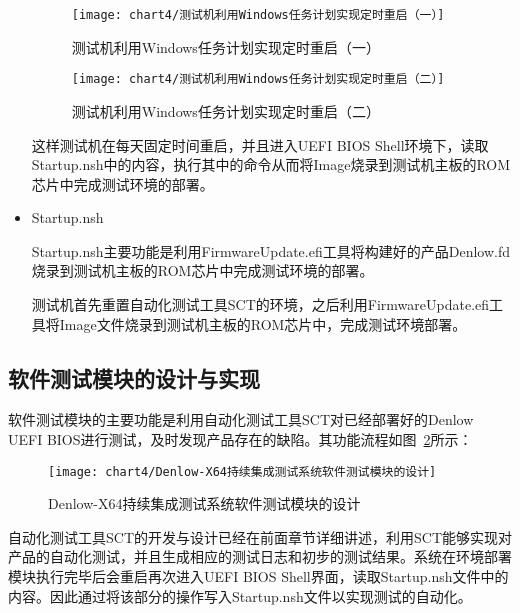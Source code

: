 \begin{itemize}
				\begin{figure}[H]
					\begin{minipage}{0.48\textwidth}
					  \centering
					  \texttt{[image: chart4/测试机利用Windows任务计划实现定时重启（一）]}
					  \caption{测试机利用Windows任务计划实现定时重启（一）}
					  \label{fig:测试机利用Windows任务计划实现定时重启（一）}
					\end{minipage}\hfill
					\begin{minipage}{0.48\textwidth}
					  \centering
					  \texttt{[image: chart4/测试机利用Windows任务计划实现定时重启（二）]}
					  \caption{测试机利用Windows任务计划实现定时重启（二）}
					  \label{fig:测试机利用Windows任务计划实现定时重启（二）}
					\end{minipage}
				\end{figure}
				
				这样测试机在每天固定时间重启，并且进入UEFI BIOS Shell环境下，读取Startup.nsh中的内容，执行其中的命令从而将Image烧录到测试机主板的ROM芯片中完成测试环境的部署。
			\item Startup.nsh
				
				Startup.nsh主要功能是利用FirmwareUpdate.efi工具将构建好的产品Denlow.fd烧录到测试机主板的ROM芯片中完成测试环境的部署。
				
				测试机首先重置自动化测试工具SCT的环境，之后利用FirmwareUpdate.efi工具将Image文件烧录到测试机主板的ROM芯片中，完成测试环境部署。
		\end{itemize}
					
	\subsection{软件测试模块的设计与实现}
		
		软件测试模块的主要功能是利用自动化测试工具SCT对已经部署好的Denlow UEFI BIOS进行测试，及时发现产品存在的缺陷。其功能流程如图~\ref{fig:Denlow-X64持续集成测试系统软件测试模块的设计}所示：
		
			\begin{figure}[H] %
				\centering
				\texttt{[image: chart4/Denlow-X64持续集成测试系统软件测试模块的设计]}
				\caption{Denlow-X64持续集成测试系统软件测试模块的设计}
				\label{fig:Denlow-X64持续集成测试系统软件测试模块的设计}
			\end{figure}
		
		自动化测试工具SCT的开发与设计已经在前面章节详细讲述，利用SCT能够实现对产品的自动化测试，并且生成相应的测试日志和初步的测试结果。系统在环境部署模块执行完毕后会重启再次进入UEFI BIOS Shell界面，读取Startup.nsh文件中的内容。因此通过将该部分的操作写入Startup.nsh文件以实现测试的自动化。
	
